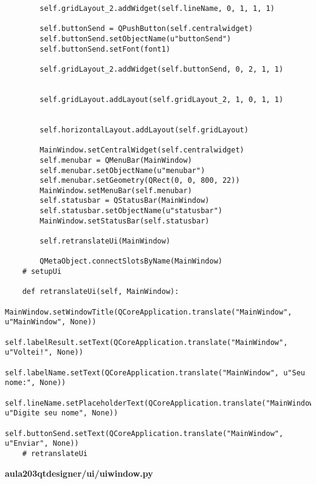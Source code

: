 \documentclass[12pt,a4paper]{article}
\begin{document}
\begin{lstlisting}
        self.gridLayout_2.addWidget(self.lineName, 0, 1, 1, 1)

        self.buttonSend = QPushButton(self.centralwidget)
        self.buttonSend.setObjectName(u"buttonSend")
        self.buttonSend.setFont(font1)

        self.gridLayout_2.addWidget(self.buttonSend, 0, 2, 1, 1)


        self.gridLayout.addLayout(self.gridLayout_2, 1, 0, 1, 1)


        self.horizontalLayout.addLayout(self.gridLayout)

        MainWindow.setCentralWidget(self.centralwidget)
        self.menubar = QMenuBar(MainWindow)
        self.menubar.setObjectName(u"menubar")
        self.menubar.setGeometry(QRect(0, 0, 800, 22))
        MainWindow.setMenuBar(self.menubar)
        self.statusbar = QStatusBar(MainWindow)
        self.statusbar.setObjectName(u"statusbar")
        MainWindow.setStatusBar(self.statusbar)

        self.retranslateUi(MainWindow)

        QMetaObject.connectSlotsByName(MainWindow)
    # setupUi

    def retranslateUi(self, MainWindow):
        MainWindow.setWindowTitle(QCoreApplication.translate("MainWindow", u"MainWindow", None))
        self.labelResult.setText(QCoreApplication.translate("MainWindow", u"Voltei!", None))
        self.labelName.setText(QCoreApplication.translate("MainWindow", u"Seu nome:", None))
        self.lineName.setPlaceholderText(QCoreApplication.translate("MainWindow", u"Digite seu nome", None))
        self.buttonSend.setText(QCoreApplication.translate("MainWindow", u"Enviar", None))
    # retranslateUi
        \end{lstlisting}
        \textbf{aula203qtdesigner/ui/uiwindow.py}
\end{document}
